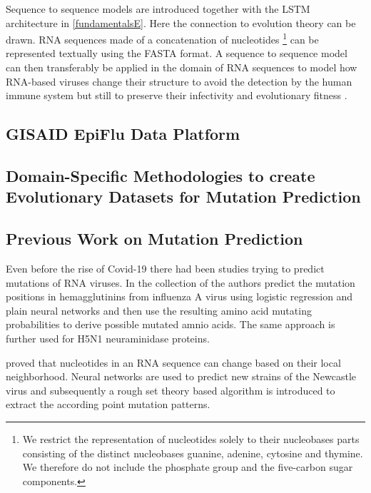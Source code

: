 Sequence to sequence models are introduced together with the \ac{LSTM} architecture in \autoref{fundamentalsE}. Here the connection to evolution theory can be drawn. \ac{RNA} sequences made of a concatenation of nucleotides \footnote{We restrict the representation of nucleotides solely to their nucleobases parts consisting of the distinct nucleobases guanine, adenine, cytosine and thymine. We therefore do not include the phosphate group and the five-carbon sugar components.} can be represented textually using the FASTA format. A sequence to sequence model can then transferably be applied in the domain of \ac{RNA} sequences to model how \ac{RNA}-based viruses change their structure to avoid the detection by the human immune system but still to preserve their infectivity and evolutionary fitness \cite{Hie2021}. 

\subsection{GISAID EpiFlu Data Platform} \label{fundamentalsB}

\subsection{Domain-Specific Methodologies to create Evolutionary  Datasets for Mutation Prediction} \label{fundamentalsC}

\subsection{Previous Work on Mutation Prediction} \label{fundamentalsD}

Even before the rise of Covid-19 there had been studies trying to predict mutations of RNA viruses. In the collection of \cite{Wu2007, Yan2007, Wu2008} the authors predict the mutation positions in hemagglutinins from influenza A virus using logistic regression and plain neural networks and then use the resulting amino acid mutating probabilities to derive possible mutated amnio acids. The same approach is further used for H5N1 neuraminidase proteins. 

\cite{Salama2016} proved that nucleotides in an RNA sequence can change based on their local neighborhood. Neural networks are used to predict new strains of the Newcastle virus and subsequently a rough set theory based algorithm is introduced to extract the according point mutation patterns. 


